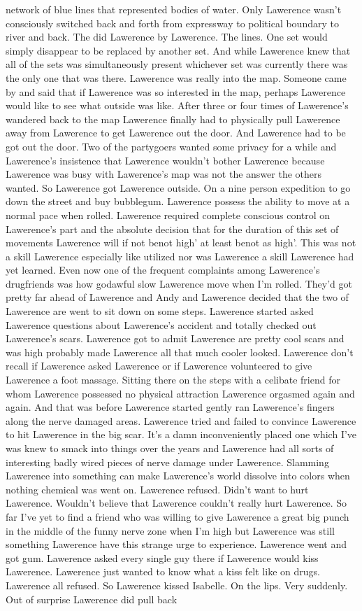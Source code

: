 \documentclass[12pt]{book}
\begin{document}
network of blue lines that represented bodies of water. Only Lawerence wasn't consciously switched back and forth from expressway to political boundary to river and back. The did Lawerence by Lawerence. The lines. One set would simply disappear to be replaced by another set. And while Lawerence knew that all of the sets was simultaneously present whichever set was currently there was the only one that was there. Lawerence was really into the map. Someone came by and said that if Lawerence was so interested in the map, perhaps Lawerence would like to see what outside was like. After three or four times of Lawerence's wandered back to the map Lawerence finally had to physically pull Lawerence away from Lawerence to get Lawerence out the door. And Lawerence had to be got out the door. Two of the partygoers wanted some privacy for a while and Lawerence's insistence that Lawerence wouldn't bother Lawerence because Lawerence was busy with Lawerence's map was not the answer the others wanted. So Lawerence got Lawerence outside. On a nine person expedition to go down the street and buy bubblegum. Lawerence possess the ability to move at a normal pace when rolled. Lawerence required complete conscious control on Lawerence's part and the absolute decision that for the duration of this set of movements Lawerence will if not benot high' at least benot as high'. This was not a skill Lawerence especially like utilized nor was Lawerence a skill Lawerence had yet learned. Even now one of the frequent complaints among Lawerence's drugfriends was how godawful slow Lawerence move when I'm rolled. They'd got pretty far ahead of Lawerence and Andy and Lawerence decided that the two of Lawerence are went to sit down on some steps. Lawerence started asked Lawerence questions about Lawerence's accident and totally checked out Lawerence's scars. Lawerence got to admit Lawerence are pretty cool scars and was high probably made Lawerence all that much cooler looked. Lawerence don't recall if Lawerence asked Lawerence or if Lawerence volunteered to give Lawerence a foot massage. Sitting there on the steps with a celibate friend for whom Lawerence possessed no physical attraction Lawerence orgasmed again and again. And that was before Lawerence started gently ran Lawerence's fingers along the nerve damaged areas. Lawerence tried and failed to convince Lawerence to hit Lawerence in the big scar. It's a damn inconveniently placed one which I've was knew to smack into things over the years and Lawerence had all sorts of interesting badly wired pieces of nerve damage under Lawerence. Slamming Lawerence into something can make Lawerence's world dissolve into colors when nothing chemical was went on. Lawerence refused. Didn't want to hurt Lawerence. Wouldn't believe that Lawerence couldn't really hurt Lawerence. So far I've yet to find a friend who was willing to give Lawerence a great big punch in the middle of the funny nerve zone when I'm high but Lawerence was still something Lawerence have this strange urge to experience. Lawerence went and got gum. Lawerence asked every single guy there if Lawerence would kiss Lawerence. Lawerence just wanted to know what a kiss felt like on drugs. Lawerence all refused. So Lawerence kissed Isabelle. On the lips. Very suddenly. Out of surprise Lawerence did pull back 
\end{document}
